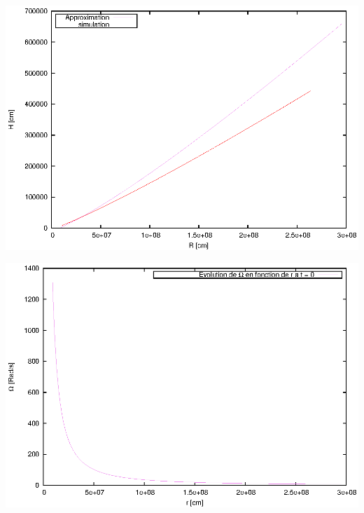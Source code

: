 \documentclass[french]{beamer}
\begin{document}
\begin{frame}
	\begin{center}
		\includegraphics[scale=0.7]{ic_h.eps}
	\end{center}
\end{frame}

\begin{frame}
	\begin{center}
		\includegraphics[scale=0.7]{Omega.eps}
	\end{center}
\end{frame}
\end{document}
